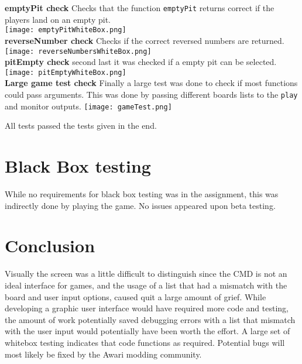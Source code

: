 \documentclass{article}
\begin{document}
        \textbf{emptyPit check}\newline
        Checks that the function \verb|emptyPit| returns correct if the players land on an empty pit.
        \\
        \texttt{[image: emptyPitWhiteBox.png]}
        \\
         \textbf{reverseNumber check}\newline
        Checks if the correct reversed numbers are returned.
        \\
        \texttt{[image: reverseNumbersWhiteBox.png]}
        \\
        
         \textbf{pitEmpty check}\newline
        second last it was checked if a empty pit can be selected. 
        \\
        \texttt{[image: pitEmptyWhiteBox.png]}
        \\
        \textbf{Large game test check}\newline
        Finally a large test was done to check if most functions could pass arguments. This was done by passing different boards lists to the \verb|play| and monitor outputs. 
         \texttt{[image: gameTest.png]}
      \newline
      
      All tests passed the tests given in the end. 
      
      \section{Black Box testing}
      While no requirements for black box testing was in the assignment, this was indirectly done by playing the game. No issues appeared upon beta testing. 
 
        
        \section{Conclusion}
        Visually the screen was a little difficult to distinguish since the CMD is not an ideal interface for games, and the usage of a list that had a mismatch with the board and user input options, caused quit a large amount of grief. While developing a graphic user interface would have required more code and testing, the amount of work potentially saved debugging errors with a list that mismatch with the user input would potentially have been worth the effort. A  large set of whitebox testing indicates that code functions as required. Potential bugs will most likely be fixed by the Awari modding community.
\end{document}
